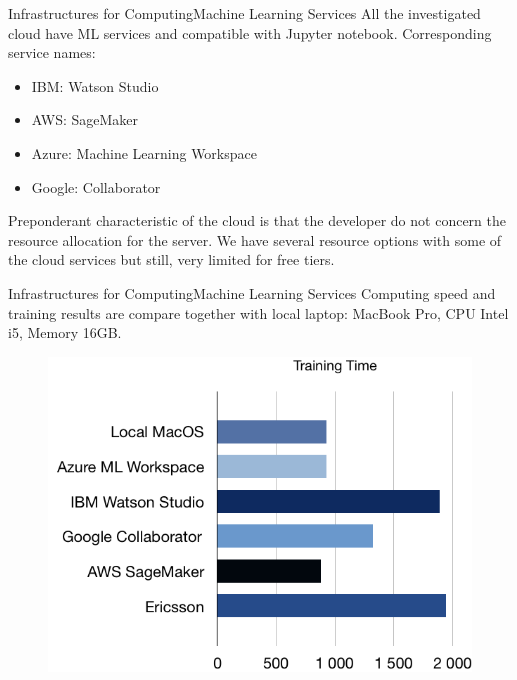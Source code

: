 \documentclass{beamer}
\begin{document}
\begin{frame}{Infrastructures for Computing}{Machine Learning Services}
All the investigated cloud have ML services and compatible with Jupyter notebook. Corresponding service names:
\begin{itemize}
	\item IBM: Watson Studio
	\item AWS: SageMaker
	\item Azure: Machine Learning Workspace
	\item Google: Collaborator
\end{itemize}
Preponderant characteristic of the cloud is that the developer do not concern the resource allocation for the server.  We have several resource options with some of the cloud services but still, very limited for free tiers.
\end{frame}


\begin{frame}{Infrastructures for Computing}{Machine Learning Services}
Computing speed and training results are compare together with local laptop: MacBook Pro, CPU Intel i5, Memory 16GB.
\begin{minipage}[h]{0.48\linewidth}  
	\centering
\begin{figure}[h]
	\centering
	\includegraphics[height=\linewidth]{Training_Time.png}
\end{figure}
\end{minipage}
\end{frame}
\end{document}
